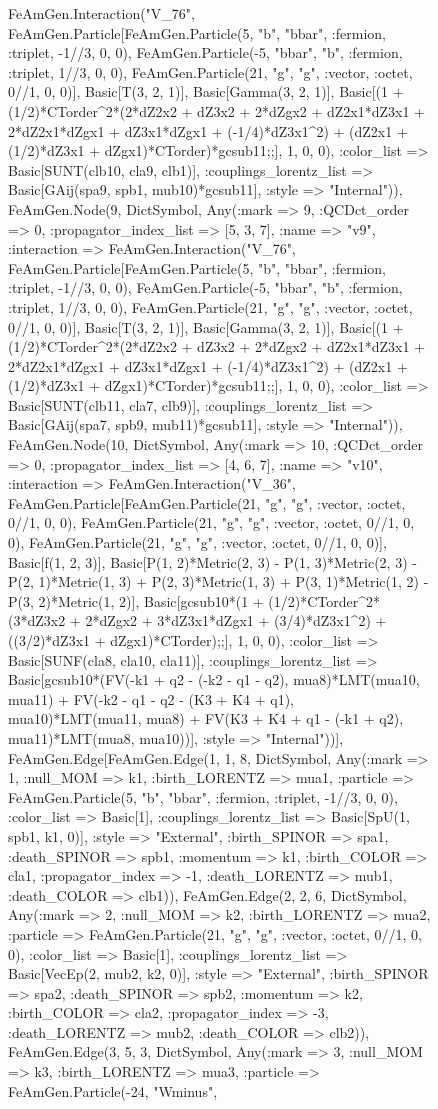 \documentclass{revtex4}
\begin{document}
\begin{figure}[!htb]
\begin{center}
{FeAmGen.Interaction("V_76", FeAmGen.Particle[FeAmGen.Particle(5, "b", "bbar", :fermion, :triplet, -1//3, 0, 0), FeAmGen.Particle(-5, "bbar", "b", :fermion, :triplet, 1//3, 0, 0), FeAmGen.Particle(21, "g", "g", :vector, :octet, 0//1, 0, 0)], Basic[T(3, 2, 1)], Basic[Gamma(3, 2, 1)], Basic[(1 + (1/2)*CTorder^2*(2*dZ2x2 + dZ3x2 + 2*dZgx2 + dZ2x1*dZ3x1 + 2*dZ2x1*dZgx1 + dZ3x1*dZgx1 + (-1/4)*dZ3x1^2) + (dZ2x1 + (1/2)*dZ3x1 + dZgx1)*CTorder)*gcsub11;;], 1, 0, 0), :color_list => Basic[SUNT(clb10, cla9, clb1)], :couplings_lorentz_list => Basic[GAij(spa9, spb1, mub10)*gcsub11], :style => "Internal")), FeAmGen.Node(9, Dict{Symbol, Any}(:mark => 9, :QCDct_order => 0, :propagator_index_list => [5, 3, 7], :name => "v9", :interaction => FeAmGen.Interaction("V_76", FeAmGen.Particle[FeAmGen.Particle(5, "b", "bbar", :fermion, :triplet, -1//3, 0, 0), FeAmGen.Particle(-5, "bbar", "b", :fermion, :triplet, 1//3, 0, 0), FeAmGen.Particle(21, "g", "g", :vector, :octet, 0//1, 0, 0)], Basic[T(3, 2, 1)], Basic[Gamma(3, 2, 1)], Basic[(1 + (1/2)*CTorder^2*(2*dZ2x2 + dZ3x2 + 2*dZgx2 + dZ2x1*dZ3x1 + 2*dZ2x1*dZgx1 + dZ3x1*dZgx1 + (-1/4)*dZ3x1^2) + (dZ2x1 + (1/2)*dZ3x1 + dZgx1)*CTorder)*gcsub11;;], 1, 0, 0), :color_list => Basic[SUNT(clb11, cla7, clb9)], :couplings_lorentz_list => Basic[GAij(spa7, spb9, mub11)*gcsub11], :style => "Internal")), FeAmGen.Node(10, Dict{Symbol, Any}(:mark => 10, :QCDct_order => 0, :propagator_index_list => [4, 6, 7], :name => "v10", :interaction => FeAmGen.Interaction("V_36", FeAmGen.Particle[FeAmGen.Particle(21, "g", "g", :vector, :octet, 0//1, 0, 0), FeAmGen.Particle(21, "g", "g", :vector, :octet, 0//1, 0, 0), FeAmGen.Particle(21, "g", "g", :vector, :octet, 0//1, 0, 0)], Basic[f(1, 2, 3)], Basic[P(1, 2)*Metric(2, 3) - P(1, 3)*Metric(2, 3) - P(2, 1)*Metric(1, 3) + P(2, 3)*Metric(1, 3) + P(3, 1)*Metric(1, 2) - P(3, 2)*Metric(1, 2)], Basic[gcsub10*(1 + (1/2)*CTorder^2*(3*dZ3x2 + 2*dZgx2 + 3*dZ3x1*dZgx1 + (3/4)*dZ3x1^2) + ((3/2)*dZ3x1 + dZgx1)*CTorder);;], 1, 0, 0), :color_list => Basic[SUNF(cla8, cla10, cla11)], :couplings_lorentz_list => Basic[gcsub10*(FV(-k1 + q2 - (-k2 - q1 - q2), mua8)*LMT(mua10, mua11) + FV(-k2 - q1 - q2 - (K3 + K4 + q1), mua10)*LMT(mua11, mua8) + FV(K3 + K4 + q1 - (-k1 + q2), mua11)*LMT(mua8, mua10))], :style => "Internal"))], FeAmGen.Edge[FeAmGen.Edge(1, 1, 8, Dict{Symbol, Any}(:mark => 1, :null_MOM => k1, :birth_LORENTZ => mua1, :particle => FeAmGen.Particle(5, "b", "bbar", :fermion, :triplet, -1//3, 0, 0), :color_list => Basic[1], :couplings_lorentz_list => Basic[SpU(1, spb1, k1, 0)], :style => "External", :birth_SPINOR => spa1, :death_SPINOR => spb1, :momentum => k1, :birth_COLOR => cla1, :propagator_index => -1, :death_LORENTZ => mub1, :death_COLOR => clb1)), FeAmGen.Edge(2, 2, 6, Dict{Symbol, Any}(:mark => 2, :null_MOM => k2, :birth_LORENTZ => mua2, :particle => FeAmGen.Particle(21, "g", "g", :vector, :octet, 0//1, 0, 0), :color_list => Basic[1], :couplings_lorentz_list => Basic[VecEp(2, mub2, k2, 0)], :style => "External", :birth_SPINOR => spa2, :death_SPINOR => spb2, :momentum => k2, :birth_COLOR => cla2, :propagator_index => -3, :death_LORENTZ => mub2, :death_COLOR => clb2)), FeAmGen.Edge(3, 5, 3, Dict{Symbol, Any}(:mark => 3, :null_MOM => k3, :birth_LORENTZ => mua3, :particle => FeAmGen.Particle(-24, "Wminus", }
\end{center}
\end{figure}
\end{document}
